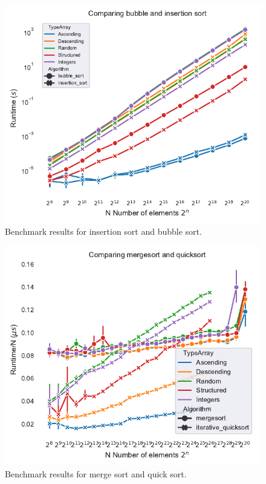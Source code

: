 \documentclass[sigconf, nonacm, natbib, screen, balance=False]{acmart}
\begin{document}
\begin{figure}[]
  \centering
  \includegraphics[scale=0.85]{runtimebubble&insertion.pdf}
  \caption{Benchmark results for insertion sort and bubble sort.}
  \label{fig:bubble_insertion}
\end{figure}

\begin{figure}[]
  \centering
  \includegraphics[scale=0.85]{runtime_per_n_merge&quick.pdf}
  \caption{Benchmark results for merge sort and quick sort.}
  \label{fig:merge_quick}
\end{figure}
\end{document}

